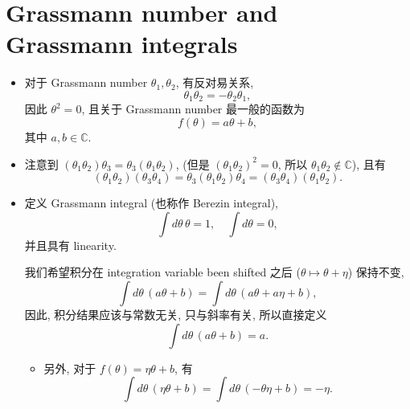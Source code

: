 \section{Grassmann number and Grassmann integrals} \label{B.2}
\begin{itemize}
	\item 对于 Grassmann number $\theta_1, \theta_2$, 有反对易关系,
	\begin{equation}
		\theta_1 \theta_2 = - \theta_2 \theta_1,
	\end{equation}
	因此 $\theta^2 = 0$, 且关于 Grassmann number 最一般的函数为
	\begin{equation}
		f(\theta) = a \theta + b,
	\end{equation}
	其中 $a, b \in \mathbb{C}$.
	
	\item 注意到 $(\theta_1 \theta_2) \theta_3 = \theta_3 (\theta_1 \theta_2)$, (但是 $(\theta_1 \theta_2)^2 = 0$, 所以 $\theta_1 \theta_2 \notin \mathbb{C}$), 且有
	\begin{equation}
		(\theta_1 \theta_2) (\theta_3 \theta_4) = \theta_3 (\theta_1 \theta_2) \theta_4 = (\theta_3 \theta_4) (\theta_1 \theta_2).
	\end{equation}
	
	\item 定义 Grassmann integral (也称作 Berezin integral),
	\begin{equation}
		\int d\theta \, \theta = 1, \quad \int d\theta = 0,
	\end{equation}
	并且具有 linearity.
	
	\begin{tcolorbox}[title=comment:]
		我们希望积分在 integration variable been shifted 之后 ($\theta \mapsto \theta + \eta$) 保持不变,
		\begin{equation}
			\int d\theta \, (a \theta + b) = \int d\theta \, (a \theta + a \eta + b),
		\end{equation}
		因此, 积分结果应该与常数无关, 只与斜率有关, 所以直接定义
		\begin{equation}
			\int d\theta \, (a \theta + b) = a.
		\end{equation}
	\end{tcolorbox}
	
	\begin{itemize}
		\item 另外, 对于 $f(\theta) = \eta \theta + b$, 有
		\begin{equation}
			\int d\theta \, (\eta \theta + b) = \int d\theta \, (- \theta \eta + b) = - \eta.
		\end{equation}
	\end{itemize}
\end{itemize}

